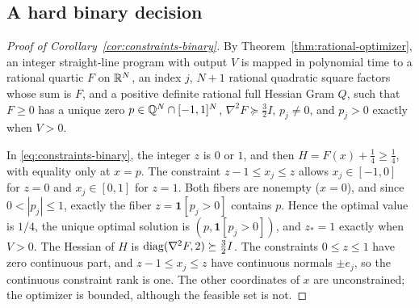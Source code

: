 \subsection{A hard binary decision}
\label{app:constraints-binary}

\begin{proof}[Proof of Corollary~\ref{cor:constraints-binary}]
By Theorem~\ref{thm:rational-optimizer}, an integer straight-line program
with output $V$ is mapped in polynomial time to a rational quartic $F$ on
$\mathbb R^N$, an index $j$, $N+1$ rational quadratic square factors whose sum is
$F$, and a positive definite rational full Hessian Gram $Q$, such that $F\ge0$
has a unique zero $p\in\mathbb Q^N\cap[-1,1]^N$, $\nabla^2F\succeq\frac32I$,
$p_j\ne0$, and $p_j>0$ exactly when $V>0$.

In \eqref{eq:constraints-binary}, the integer $z$ is $0$ or $1$, and then
$H=F(x)+\frac14\ge\frac14$, with equality only at $x=p$. The constraint
$z-1\le x_j\le z$ allows $x_j\in[-1,0]$ for $z=0$ and $x_j\in[0,1]$ for
$z=1$. Both fibers are nonempty ($x=0$), and since $0<|p_j|\le1$, exactly the
fiber $z=\mathbf 1[p_j>0]$ contains $p$. Hence the optimal value is $1/4$,
the unique optimal solution is $(p,\mathbf 1[p_j>0])$, and $z_*=1$ exactly
when $V>0$. The Hessian of $H$ is $\operatorname{diag}(\nabla^2F,2)\succeq\frac32I$. The
constraints $0\le z\le1$ have zero continuous part, and $z-1\le x_j\le z$
have continuous normals $\pm e_j$, so the continuous constraint rank is one.
The other coordinates of $x$ are unconstrained; the optimizer is bounded,
although the feasible set is not.


\end{proof}
